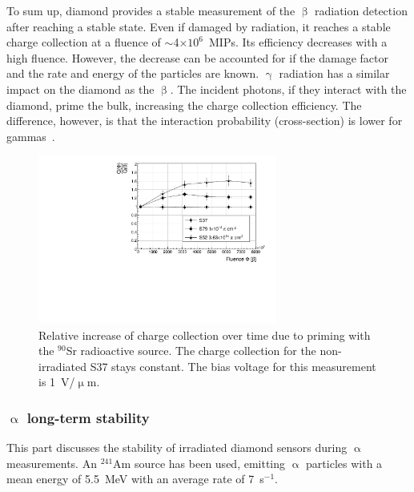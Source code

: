 
To sum up, diamond provides a stable measurement of the $\upbeta$ radiation detection after reaching a stable state. Even if damaged by radiation, it reaches a stable charge collection at a fluence of $\sim$4$\times10^6$~MIPs. Its efficiency decreases with a high fluence. %
However, the decrease can be accounted for if the damage factor and the rate and energy of the particles are known. $\upgamma$ radiation has a similar impact on the diamond as the $\upbeta$. The incident photons, if they interact with the diamond, prime the bulk, increasing the charge collection efficiency. The difference, however, is that the interaction probability (cross-section) is lower for gammas~\cite{sarin2014comprehensive,Griesmayer20121997}.

\begin{figure}[!t]
\begin{center}
\includegraphics[width=0.7\textwidth]{03_measurement_results/plots/ccdpriming}
\caption{Relative increase of charge collection over time due to priming with the $^{90}$Sr radioactive source. The charge collection for the non-irradiated S37 stays constant. The bias voltage for this measurement is 1~V/$\upmu$m.}
\label{fig:ccincrease}
\end{center}
\end{figure}

\subsubsection{$\upalpha$ long-term stability}
This part discusses the stability of irradiated diamond sensors during $\upalpha$ measurements. An $^{241}$Am source has been used, emitting $\upalpha$ particles with a mean energy of 5.5~MeV with an average rate of 7~s$^{-1}$. 

